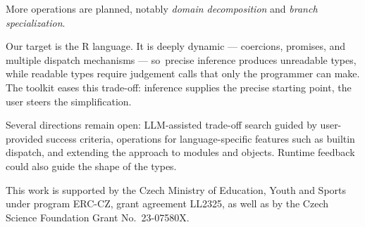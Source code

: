 \documentclass[sigplan,screen]{acmart}
\begin{document}
More operations are planned, notably \emph{domain decomposition}
and \emph{branch specialization}.

Our target is the R language.  It is deeply dynamic ---
coercions, promises, and multiple dispatch
mechanisms --- so~precise inference produces unreadable types, while
readable types require judgement calls that only the programmer can
make.  The toolkit eases this
trade-off: inference supplies the precise starting point, the user
steers the simplification.

Several directions remain open: LLM-assisted trade-off search guided
by user-provided success criteria, operations for language-specific
features such as builtin dispatch, and extending the approach to
modules and objects. Runtime feedback could also guide the shape of the types.

\begin{acks}
This work is supported by the Czech Ministry of Education, Youth and Sports under program ERC-CZ, grant agreement LL2325,
        as well as by the Czech Science Foundation Grant No.~23-07580X.
\end{acks}



\end{document}
